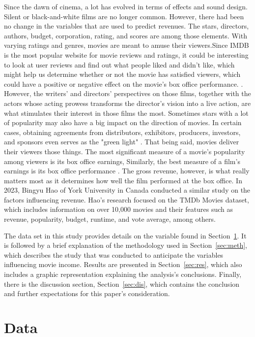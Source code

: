 \documentclass[12pt]{article}
\begin{document}
Since the dawn of cinema, a lot has evolved in terms of effects and sound design. 
Silent or black-and-white films are no longer common. However, there had been no
change in the variables that are used to predict revenues. The stars, directors,
authors, budget, corporation, rating, and scores are among those elements. With 
varying ratings and genres, movies are meant to amuse their viewers.Since IMDB is the
most popular website for movie reviews and ratings, it could be interesting to look at 
user reviews and find out what people liked and didn't like, which might help us determine
whether or not the movie has satisfied viewers, which could have a positive or negative 
effect on the movie's box office performance. \citep{5}. However, the writers' and directors' perspectives on
those films, together with the actors whose acting prowess transforms the director's vision 
into a live action, are what stimulates their interest in those films the most. Sometimes
stars with a lot of popularity may also have a big impact on the direction of movies. In certain cases,
obtaining agreements from distributors, exhibitors, producers, investors, and sponsors 
even serves as the "green light" \citep{4}. That being said, movies deliver their 
viewers those things. The most significant measure of a movie's popularity among viewers
is its box office earnings, Similarly, the best measure of a film's earnings is its box 
office performance \citep{1}. The gross revenue, however, is what really matters most as it 
determines how well the film performed at the box office. In 2023, Bingyu Hao of York
University in Canada conducted a similar study on the factors influencing revenue. 
Hao's research focused on the TMDb Movies dataset, which includes information on over 
10,000 movies and their features such as revenue, popularity, budget, runtime, and vote 
average, among others.

The data set in this study provides details on the variable found in Section~\ref{sec:data}. 
It is followed by a brief explanation of the methodology used in Section~\ref{sec:meth}, 
which describes the study that was conducted to anticipate the variables influencing movie 
income. Results are presented in Section~\ref{sec:res}, which also includes a graphic representation
explaining the analysis's conclusions. Finally, there is the discussion section, 
Section~\ref{sec:dis}, which contains the conclusion and further expectations for this
paper's consideration.

\section{Data}
\label{sec:data}
\end{document}
